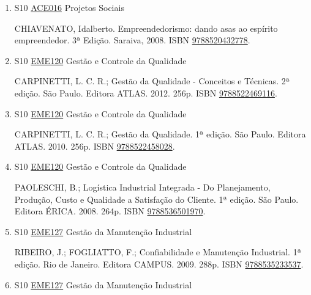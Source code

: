 \documentclass[12pt,a4paper]{book}
\begin{document}
\begin{enumerate}
 
 \item S10 \hyperref[PUD:ACE016]{ACE016} Projetos Sociais

  CHIAVENATO, Idalberto.  Empreendedorismo: dando asas ao espírito empreendedor.  3ª Edição.  Saraiva, 2008.  ISBN \href{http://www.bn.br/site/pages/servicosProfissionais/agenciaISBN/isbnBusca/FbnBuscaISBNCatalogo.asp?pField=ISBN&pIntPagina=1&pISBN=20432778&nidbISBN=true&hidbISBN=true}{9788520432778}.
 \item S10 \hyperref[PUD:EME120]{EME120} Gestão e Controle da Qualidade

 CARPINETTI, L.  C.  R.;  Gestão da Qualidade - Conceitos e Técnicas.  2ª edição.  São Paulo.  Editora ATLAS.  2012.  256p.  ISBN \href{http://www.bn.br/site/pages/servicosProfissionais/agenciaISBN/isbnBusca/FbnBuscaISBNCatalogo.asp?pField=ISBN&pIntPagina=1&pISBN=22469116&nidbISBN=true&hidbISBN=true}{9788522469116}. 
 
 
 \item S10 \hyperref[PUD:EME120]{EME120} Gestão e Controle da Qualidade

 CARPINETTI, L.  C.  R.;  Gestão da Qualidade.  1ª edição.  São Paulo.  Editora ATLAS.  2010.  256p.  ISBN \href{http://www.bn.br/site/pages/servicosProfissionais/agenciaISBN/isbnBusca/FbnBuscaISBNCatalogo.asp?pField=ISBN&pIntPagina=1&pISBN=22458028&nidbISBN=true&hidbISBN=true}{9788522458028}. 
 
 
 \item S10 \hyperref[PUD:EME120]{EME120} Gestão e Controle da Qualidade

 PAOLESCHI, B.;  Logística Industrial Integrada - Do Planejamento, Produção, Custo e Qualidade a Satisfação do Cliente.  1ª edição.  São Paulo.  Editora ÉRICA.  2008.  264p.  ISBN \href{http://www.bn.br/site/pages/servicosProfissionais/agenciaISBN/isbnBusca/FbnBuscaISBNCatalogo.asp?pField=ISBN&pIntPagina=1&pISBN=36501970&nidbISBN=true&hidbISBN=true}{9788536501970}.
 \item S10 \hyperref[PUD:EME127]{EME127} Gestão da Manutenção Industrial

 RIBEIRO, J.;  FOGLIATTO, F.;  Confiabilidade e Manutenção Industrial.  1ª edição.  Rio de Janeiro.  Editora CAMPUS.  2009.  288p.  ISBN \href{http://www.bn.br/site/pages/servicosProfissionais/agenciaISBN/isbnBusca/FbnBuscaISBNCatalogo.asp?pField=ISBN&pIntPagina=1&pISBN=35233537&nidbISBN=true&hidbISBN=true}{9788535233537}.
 \item S10 \hyperref[PUD:EME127]{EME127} Gestão da Manutenção Industrial


\end{enumerate}
\end{document}
